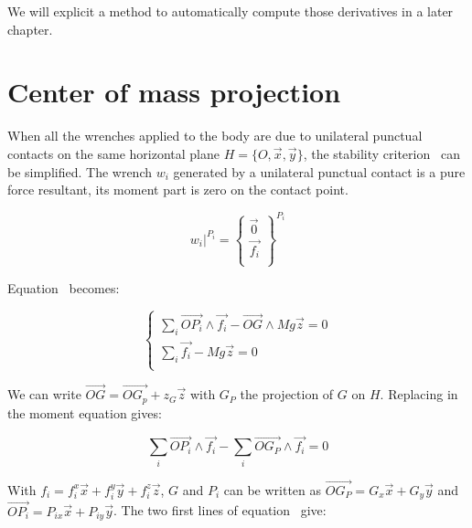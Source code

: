 We will explicit a method to automatically compute those derivatives in a later chapter.



\section{Center of mass projection}
\label{sec:center_of_mass_projection}


When all the wrenches applied to the body are due to unilateral punctual contacts on the same horizontal plane $H = \{O, \vec{x}, \vec{y}\}$, the stability criterion~ can be simplified.
The wrench $w_i$ generated by a unilateral punctual contact is a pure force resultant, its moment part is zero on the contact point.

\begin{equation*}
    \left. w_i \right|^{P_i} =
    \left\{
      \begin{array}{r}
      \vec{0}\\
      \vec{f_i}\\
  \end{array} \right\}^{P_i}
\end{equation*}

Equation~ becomes:

\begin{equation}
\left\{
\begin{array}{r}
  \sum\limits_i \overrightarrow{OP_i}\wedge \vec{f_i} - \overrightarrow{OG} \wedge Mg\vec{z} = 0 \\
  \sum\limits_i \vec{f_i} - Mg\vec{z} = 0 \\
\end{array}
\right.
\end{equation}

We can write $\overrightarrow{OG} = \overrightarrow{OG_p} + z_G\vec{z}$ with $G_P$ the projection of $G$ on $H$. Replacing in the moment equation gives:

\begin{equation}
  \sum\limits_i \overrightarrow{OP_i}\wedge \vec{f_i} - \sum\limits_i\overrightarrow{OG_P} \wedge \vec{f_i} = 0
\label{eq:projCoM}
\end{equation}

With $f_i = f_i^x\vec{x} + f_i^y\vec{y} + f_i^z\vec{z}$, $G$ and $P_i$ can be written as $\overrightarrow{OG_P} = G_x \vec{x} + G_y\vec{y}$ and $\overrightarrow{OP_i} = P_{ix} \vec{x} + P_{iy} \vec{y}$. The two first lines of equation~ give:

